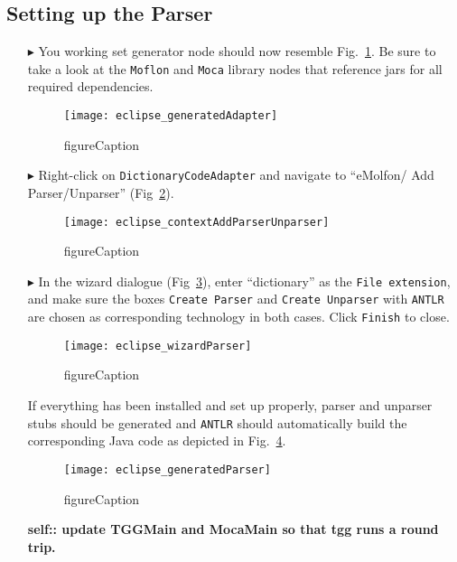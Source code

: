 \newpage
\hypertarget{subSec:setupParser}{}
\subsection{Setting up the Parser}
\genHeader

\begin{itemize}

\item[$\blacktriangleright$] You working set generator node should now resemble Fig.~\ref{eclipse:generatedAdapter}. Be sure to take a look at the
\texttt{Moflon} and \texttt{Moca} library nodes that reference jars for all required dependencies.

\begin{figure}[htpb]
\begin{center}
  \texttt{[image: eclipse\_generatedAdapter]}
  \caption{figureCaption}
  \label{eclipse:generatedAdapter}
\end{center}
\end{figure}

\item[$\blacktriangleright$] Right-click on \texttt{DictionaryCodeAdapter} and navigate to ``eMolfon/ Add Parser/Unparser'' (Fig~\ref{eclipse:contextParser}).

\begin{figure}[htpb]
\begin{center}
  \texttt{[image: eclipse\_contextAddParserUnparser]}
  \caption{figureCaption}
  \label{eclipse:contextParser}
\end{center}
\end{figure}

\item[$\blacktriangleright$] In the wizard dialogue (Fig~\ref{eclipse:wizardParser}), enter ``dictionary'' as the \texttt{File extension}, and make sure
the boxes \texttt{Create Parser} and \texttt{Create Unparser} with \texttt{ANTLR} are chosen as corresponding technology in both cases. Click \texttt{Finish} to
close.

\begin{figure}[htpb]
\begin{center}
  \texttt{[image: eclipse\_wizardParser]}
  \caption{figureCaption}
  \label{eclipse:wizardParser}
\end{center}
\end{figure}

If everything has been installed and set up properly, parser and unparser stubs should be generated and \texttt{ANTLR} should automatically build the
corresponding Java code as depicted in Fig.~\ref{eclipse:generatedParser}.

\begin{figure}[htpb]
\begin{center}
  \texttt{[image: eclipse\_generatedParser]}
  \caption{figureCaption}
  \label{eclipse:generatedParser}
\end{center}
\end{figure}

{\bf self:: update TGGMain and MocaMain so that tgg runs a round trip.}

\end{itemize}
